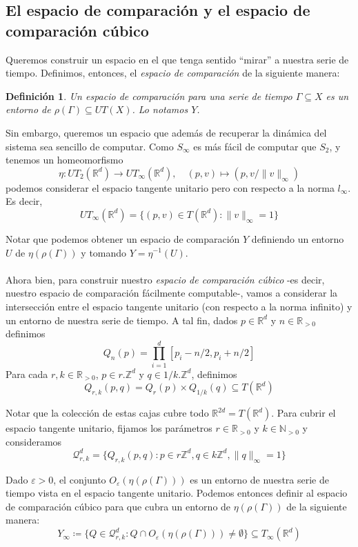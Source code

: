 \documentclass[12pt,a4paper]{article}
\newtheorem{definition}[theorem]{Definición}
\begin{document}
\subsection{El espacio de comparación y el espacio de comparación cúbico}
Queremos construir un espacio en el que tenga sentido ``mirar'' a nuestra serie de tiempo. Definimos, entonces, el \textit{espacio de comparación} de la siguiente manera:
\begin{definition}
    Un espacio de comparación para una serie de tiempo $\Gamma \subseteq X$ es un entorno de $\rho(\Gamma) \subseteq UT(X)$. Lo notamos $Y$.
\end{definition}
Sin embargo, queremos un espacio que además de recuperar la dinámica del sistema sea sencillo de computar. Como $S_\infty$ es más fácil de computar que $S_2$, y tenemos un homeomorfismo
\[
    \eta : UT_2(\mathbb{R}^d) \rightarrow UT_\infty(\mathbb{R}^d), \quad (p,v) \mapsto (p,v/\|v\|_\infty)
\]
podemos considerar el espacio tangente unitario pero con respecto a la norma $l_\infty$. Es decir,
\[
    UT_\infty(\mathbb{R}^d) = \{(p,v) \in T(\mathbb{R}^d): \|v\|_\infty = 1 \}
\]

Notar que podemos obtener un espacio de comparación $Y$ definiendo un entorno $U$ de $\eta(\rho(\Gamma))$ y tomando $Y = \eta^{-1}(U)$.
\\
\\
Ahora bien, para construir nuestro \textit{espacio de comparación cúbico} -es decir, nuestro espacio de comparación fácilmente computable-, vamos a considerar la intersección entre el espacio tangente unitario (con respecto a la norma infinito) y un entorno de nuestra serie de tiempo. A tal fin, dados $p \in \mathbb{R}^d$ y $n \in \mathbb{R}_{>0}$ definimos
\[
    Q_n(p) = \prod_{i=1}^d [p_i - n/2, p_i +n/2]
\]
Para cada $r, k \in \mathbb{R}_{>0}$, $p \in r.\mathbb{Z}^d$ y $q \in 1/k.\mathbb{Z}^d$, definimos
\[
    Q_{r,k}(p,q) = Q_r(p) \times Q_{1/k}(q) \subseteq T(\mathbb{R}^d)
\]

Notar que la colección de estas cajas cubre todo $\mathbb{R}^{2d} = T(\mathbb{R}^d)$. Para cubrir el espacio tangente unitario, fijamos los parámetros $r \in \mathbb{R}_{>0}$ y $k \in \mathbb{N}_{>0}$ y consideramos
\[
    \mathcal{Q}^d_{r,k} = \{Q_{r,k}(p,q) : p \in r\mathbb{Z}^d, q \in k\mathbb{Z}^d, \|q\|_\infty = 1 \}
\]

Dado $\varepsilon > 0$, el conjunto $O_\varepsilon(\eta(\rho(\Gamma)))$ es un entorno de nuestra serie de tiempo vista en el espacio tangente unitario. Podemos entonces definir al espacio de comparación cúbico para que cubra un entorno de $\eta(\rho(\Gamma))$ de la siguiente manera:
\[
    Y_\infty \coloneqq \{Q \in \mathcal{Q}^d_{r,k} : Q \cap O_\varepsilon(\eta(\rho(\Gamma))) \neq \emptyset \} \subseteq T_{\infty}(\mathbb{R}^d)
\]
\end{document}
